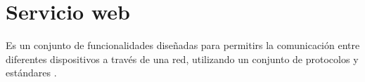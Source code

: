 \section{Servicio web} \label{Servicio web}

Es un conjunto de funcionalidades diseñadas para permitirs la comunicación entre diferentes dispositivos a través de una red, utilizando un conjunto de protocolos y estándares \cite{WBS0}.